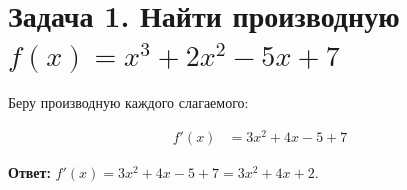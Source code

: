 \documentclass{article}
\begin{document}
\section*{Задача 1. Найти производную $f(x) = x^3 + 2x^2 - 5x + 7$}

Беру производную каждого слагаемого:

\begin{align*}
f'(x) &= 3x^2 + 4x - 5 + 7
\end{align*}


\textbf{Ответ:} $f'(x) = 3x^2 + 4x - 5 + 7 = 3x^2 + 4x + 2$.
\end{document}
